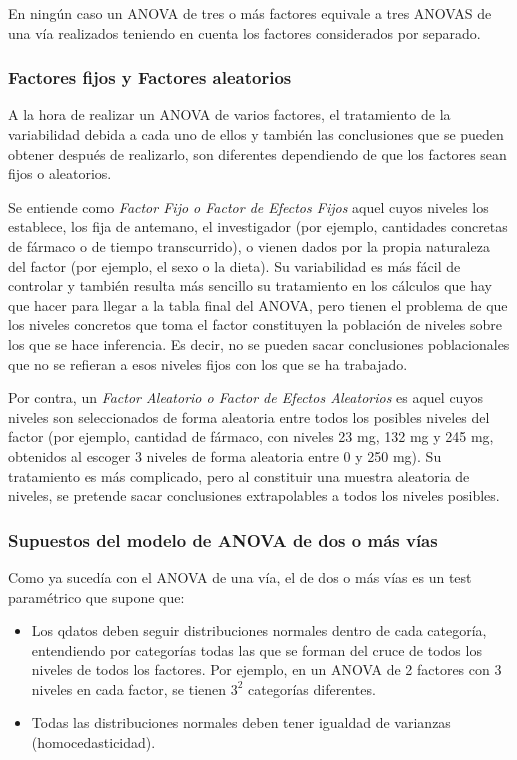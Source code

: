 En ningún caso un ANOVA de tres o más factores equivale a tres ANOVAS de una vía realizados teniendo en cuenta los factores considerados por
separado.


\subsubsection{Factores fijos y Factores aleatorios}
A la hora de realizar un ANOVA de varios factores, el tratamiento de la variabilidad debida a cada uno de ellos y también las conclusiones
que se pueden obtener después de realizarlo, son diferentes dependiendo de que los factores sean fijos o aleatorios.

Se entiende como \emph{Factor Fijo o Factor de Efectos Fijos} aquel cuyos niveles los establece, los fija de antemano, el investigador (por
ejemplo, cantidades concretas de fármaco o de tiempo transcurrido), o vienen dados por la propia naturaleza del factor (por ejemplo, el sexo
o la dieta). Su variabilidad es más fácil de controlar y también resulta más sencillo su tratamiento en los cálculos que hay que hacer para
llegar a la tabla final del ANOVA, pero tienen el problema de que los niveles concretos que toma el factor constituyen la población de
niveles sobre los que se hace inferencia. Es decir, no se pueden sacar conclusiones poblacionales que no se refieran a esos niveles fijos
con los que se ha trabajado.

Por contra, un \emph{Factor Aleatorio o Factor de Efectos Aleatorios} es aquel cuyos niveles son seleccionados de forma aleatoria entre
todos los posibles niveles del factor (por ejemplo, cantidad de fármaco, con niveles 23 mg, 132 mg y 245 mg, obtenidos al escoger 3 niveles
de forma aleatoria entre 0 y 250 mg). Su tratamiento es más complicado, pero al constituir una muestra aleatoria de niveles, se pretende
sacar conclusiones extrapolables a todos los niveles posibles.


\subsubsection{Supuestos del modelo de ANOVA de dos o más vías}
Como ya sucedía con el ANOVA de una vía, el de dos o más vías es un test paramétrico que supone que:
\begin{itemize}
\item Los qdatos deben seguir distribuciones normales dentro de cada categoría, entendiendo por categorías todas las que se forman del cruce
de todos los niveles de todos los factores. Por ejemplo, en un ANOVA de 2 factores con 3 niveles en cada factor, se tienen $3^2$ categorías
diferentes.
\item Todas las distribuciones normales deben tener igualdad de varianzas (homocedasticidad).
\end{itemize}

